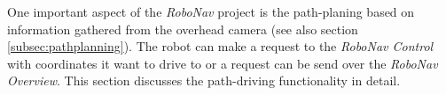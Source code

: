 One important aspect of the \textit{RoboNav} project is the path-planing based on information gathered from the overhead camera (see also section \ref{subsec:pathplanning}). The robot can make a request to the \textit{RoboNav Control} with coordinates it want to drive to or a request can be send over the \textit{RoboNav Overview}. This section discusses the path-driving functionality in detail.
